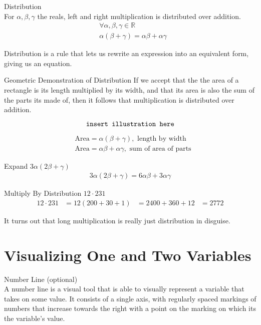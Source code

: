 \documentclass{book}
\begin{document}
  {\axiom Distribution \\
    For $\alpha, \beta, \gamma$ the reals, left and right multiplication is distributed over addition.
    \begin{align*}
      & \forall \alpha, \beta, \gamma \in \mathbb{R}\\
      & \alpha (\beta + \gamma) = \alpha \beta + \alpha \gamma
    \end{align*}

    Distribution is a rule that lets us rewrite an expression into an equivalent form, giving us an equation.\\
  }

  {\remark Geometric Demonstration of Distribution 
    If we accept that the the area of a rectangle is its length multiplied by its width, and that its area is also the sum of the parts its made of, then it follows that multiplication is distributed over addition.

    $$\text{\texttt{insert illustration here}}$$

    \begin{align*}
      & \text{Area} = \alpha (\beta + \gamma), \text{ length by width}\\
      & \text{Area} = \alpha \beta + \alpha \gamma, \text{ sum of area of parts}
    \end{align*}
  }

  {\example Expand $3 \alpha(2 \beta + \gamma)$ 
    \begin{align*}
      3 \alpha (2 \beta + \gamma) = 6 \alpha \beta + 3 \alpha \gamma
    \end{align*}
  }

  {\example Multiply By Distribution $12 \cdot 231$
    \begin{align*}
      12 \cdot 231 & = 12 (200 + 30 + 1)
      & = 2400 + 360 + 12
      & = 2772
    \end{align*}

    It turns out that long multiplication is really just distribution in disguise.\\
  }

  \chapter{Visualizing One and Two Variables}

  {\remark Number Line (optional) \\
    A number line is a visual tool that is able to visually represent a variable that takes on some value. It consists of a single axis, with regularly spaced markings of numbers that increase towards the right with a point on the marking on which its the variable's value.\\
  }
\end{document}
